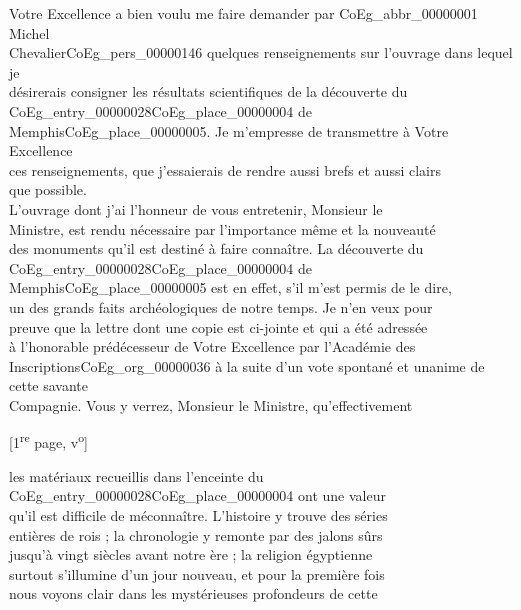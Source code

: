 \documentclass{book}
\begin{document}
\indent Votre Excellence a bien voulu me faire demander par \gls{CoEg_abbr_00000001} Michel\\
Chevalier\gls{CoEg_pers_00000146} quelques renseignements sur l’ouvrage dans lequel je\\
désirerais consigner les résultats scientifiques de la découverte du\\
\Gls{CoEg_entry_00000028}\gls{CoEg_place_00000004} de Memphis\gls{CoEg_place_00000005}. Je m’empresse de transmettre à Votre Excellence\\
ces renseignements, que j’essaierais de rendre aussi brefs et aussi clairs\\
que possible.\\
\indent L’ouvrage dont j’ai l’honneur de vous entretenir, Monsieur le\\
Ministre, est rendu nécessaire par l’importance même et la nouveauté\\
des monuments qu’il est destiné à faire connaître. La découverte du\\
\Gls{CoEg_entry_00000028}\gls{CoEg_place_00000004} de Memphis\gls{CoEg_place_00000005} est en effet, s’il m’est permis de le dire,\\
un des grands faits archéologiques de notre temps. Je n’en veux pour\\
preuve que la lettre dont une copie est ci-jointe et qui a été adressée\\
à l’honorable prédécesseur de Votre Excellence par l’Académie des\\
Inscriptions\gls{CoEg_org_00000036} à la suite d’un vote spontané et unanime de cette savante\\
Compagnie. Vous y verrez, Monsieur le Ministre, qu’effectivement
{\footnotesize\begin{center} {[1\textsuperscript{re} page, v\textsuperscript{o}]}\end{center}}
\noindent les matériaux recueillis dans l’enceinte du \Gls{CoEg_entry_00000028}\gls{CoEg_place_00000004} ont une valeur\\
qu’il est difficile de méconnaître. L’histoire y trouve des séries\\
entières de rois ; la chronologie y remonte par des jalons sûrs\\
jusqu’à vingt siècles avant notre ère ; la religion égyptienne\\
surtout s’illumine d’un jour nouveau, et pour la première fois\\
nous voyons clair dans les mystérieuses profondeurs de cette\\
\end{document}
